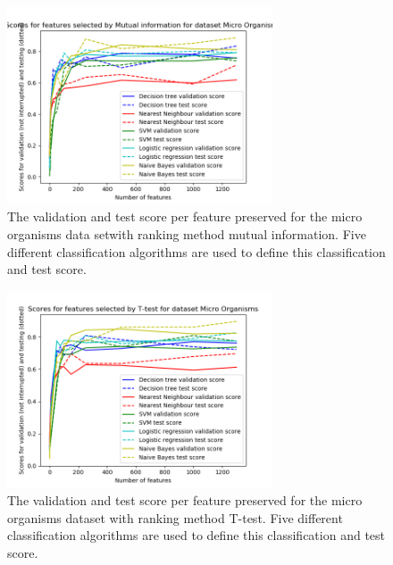 \documentclass[10pt,a4paper]{article}
\begin{document}
	\begin{figure}[H]
		\includegraphics[width=0.7\textwidth]{MO_MI_Val_Test_Score.png}
		\caption{The validation and test score per feature preserved for the micro organisms data setwith ranking method mutual information. Five different classification algorithms are used to define this classification and test score.}
		\label{fig:MO_MI_Val_Test_Score}
	\end{figure}
	
	\begin{figure}[H]
		\includegraphics[width=0.7\textwidth]{MO_T_Val_Test_Score.png}
		\caption{The validation and test score per feature preserved for the micro organisms dataset with ranking method T-test. Five different classification algorithms are used to define this classification and test score.}
		\label{fig:MO_T_Val_Test_Score}
	\end{figure}
\end{document}
